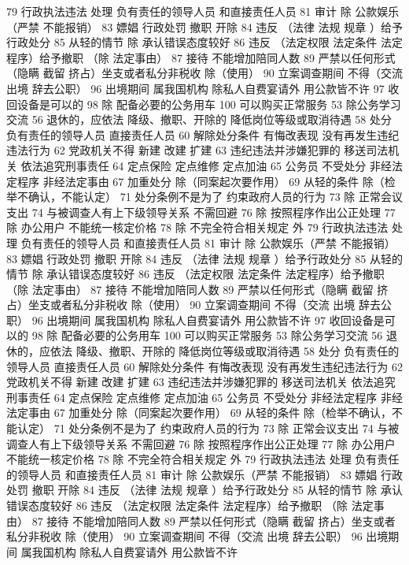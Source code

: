 \documentclass[cyan]{elegantnote}
\begin{document}
79 行政执法违法 处理
负有责任的领导人员
和直接责任人员
81 审计
除 公款娱乐（严禁 不能报销）
83 嫖娼 行政处罚
撤职 开除
84 违反 （法律 法规 规章 ）给予行政处分
85 从轻的情节
除 承认错误态度较好
86 违反 （法定权限 法定条件 法定程序）给予撤职
（除 法定事由）
87 接待 不能增加陪同人数
89 严禁以任何形式（隐瞒 截留 挤占）坐支或者私分非税收
除（使用）
90 立案调查期间 不得（交流 出境 辞去公职）
96 出境期间 属我国机构 除私人自费宴请外 用公款皆不许
97 收回设备是可以的
98 除 配备必要的公务用车
100 可以购买正常服务
53 除公务学习交流
56 退休的，应依法
降级、撤职、开除的 降低岗位等级或取消待遇
58 处分
负有责任的领导人员
直接责任人员
60 解除处分条件
有悔改表现
没有再发生违纪违法行为
62 党政机关不得
新建 改建 扩建
63 违纪违法并涉嫌犯罪的
移送司法机关
依法追究刑事责任
64 定点保险 定点维修 定点加油
65 公务员 不受处分
非经法定程序
非经法定事由
67 加重处分
除（同案起次要作用）
69 从轻的条件
除（检举不确认，不能认定）
71 处分条例不是为了
约束政府人员的行为
73 除 正常会议支出
74 与被调查人有上下级领导关系 不需回避
76 除 按照程序作出公正处理
77 除 办公用户
不能统一核定价格
78 除 不完全符合相关规定 外
79 行政执法违法 处理
负有责任的领导人员
和直接责任人员
81 审计
除 公款娱乐（严禁 不能报销）
83 嫖娼 行政处罚
撤职 开除
84 违反 （法律 法规 规章 ）给予行政处分
85 从轻的情节
除 承认错误态度较好
86 违反 （法定权限 法定条件 法定程序）给予撤职
（除 法定事由）
87 接待 不能增加陪同人数
89 严禁以任何形式（隐瞒 截留 挤占）坐支或者私分非税收
除（使用）
90 立案调查期间 不得（交流 出境 辞去公职）
96 出境期间 属我国机构 除私人自费宴请外 用公款皆不许
97 收回设备是可以的
98 除 配备必要的公务用车
100 可以购买正常服务
53 除公务学习交流
56 退休的，应依法
降级、撤职、开除的 降低岗位等级或取消待遇
58 处分
负有责任的领导人员
直接责任人员
60 解除处分条件
有悔改表现
没有再发生违纪违法行为
62 党政机关不得
新建 改建 扩建
63 违纪违法并涉嫌犯罪的
移送司法机关
依法追究刑事责任
64 定点保险 定点维修 定点加油
65 公务员 不受处分
非经法定程序
非经法定事由
67 加重处分
除（同案起次要作用）
69 从轻的条件
除（检举不确认，不能认定）
71 处分条例不是为了
约束政府人员的行为
73 除 正常会议支出
74 与被调查人有上下级领导关系 不需回避
76 除 按照程序作出公正处理
77 除 办公用户
不能统一核定价格
78 除 不完全符合相关规定 外
79 行政执法违法 处理
负有责任的领导人员
和直接责任人员
81 审计
除 公款娱乐（严禁 不能报销）
83 嫖娼 行政处罚
撤职 开除
84 违反 （法律 法规 规章 ）给予行政处分
85 从轻的情节
除 承认错误态度较好
86 违反 （法定权限 法定条件 法定程序）给予撤职
（除 法定事由）
87 接待 不能增加陪同人数
89 严禁以任何形式（隐瞒 截留 挤占）坐支或者私分非税收
除（使用）
90 立案调查期间 不得（交流 出境 辞去公职）
96 出境期间 属我国机构 除私人自费宴请外 用公款皆不许
\end{document}
